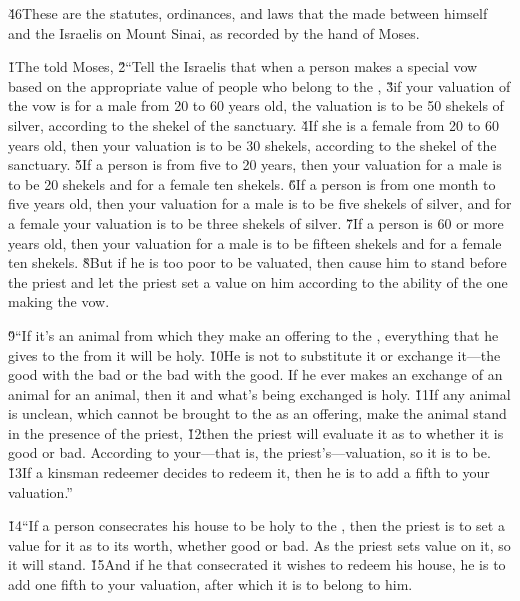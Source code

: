 \v{46}These are the statutes, ordinances, and laws that the  made between himself and the Israelis on Mount Sinai, as recorded by the hand of Moses.

\v{1}The  told Moses, \v{2}``Tell the Israelis that when a person makes a special vow based on the appropriate value of people who belong to the , \v{3}if your valuation of the vow is for a male from 20 to 60 years old, the valuation is to be 50 shekels of silver, according to the shekel of the sanctuary. \v{4}If she is a female from 20 to 60 years old, then your valuation is to be 30 shekels, according to the shekel of the sanctuary. \v{5}If a person is from five to 20 years, then your valuation for a male is to be 20 shekels and for a female ten shekels. \v{6}If a person is from one month to five years old, then your valuation for a male is to be five shekels of silver, and for a female your valuation is to be three shekels of silver. \v{7}If a person is 60 or more years old, then your valuation for a male is to be fifteen shekels and for a female ten shekels. \v{8}But if he is too poor to be valuated, then cause him to stand before the priest and let the priest set a value on him according to the ability of the one making the vow.

\v{9}``If it's an animal from which they make an offering to the , everything that he gives to the  from it will be holy. \v{10}He is not to substitute it or exchange it---the good with the bad or the bad with the good. If he ever makes an exchange of an animal for an animal, then it and what's being exchanged is holy. \v{11}If any animal is unclean, which cannot be brought to the  as an offering, make the animal stand in the presence of the priest, \v{12}then the priest will evaluate it as to whether it is good or bad. According to your---that is, the priest's---valuation, so it is to be. \v{13}If a kinsman redeemer decides to redeem it, then he is to add a fifth to your valuation.''

\v{14}``If a person consecrates his house to be holy to the , then the priest is to set a value for it as to its worth, whether good or bad. As the priest sets value on it, so it will stand. \v{15}And if he that consecrated it wishes to redeem his house, he is to add one fifth to your valuation, after which it is to belong to him.

